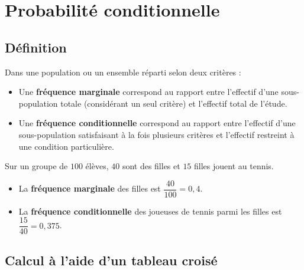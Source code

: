 \section{Probabilité conditionnelle}

\subsection{Définition}

\begin{defin}
	Dans une population ou un ensemble réparti selon deux critères :

	\begin{itemize}
		\item Une \textbf{fréquence marginale} correspond au rapport entre l'effectif d'une sous-population totale (considérant un seul critère) et l'effectif total de l'étude.
		\item Une \textbf{fréquence conditionnelle} correspond au rapport entre l'effectif d'une sous-population satisfaisant à la fois plusieurs critères et l'effectif restreint à une condition particulière.
	\end{itemize}
\end{defin}

\begin{ex}
	Sur un groupe de $100$ élèves, $40$ sont des filles et $15$ filles jouent au tennis.

	\begin{itemize}
		\item La \textbf{fréquence marginale} des filles est $\dfrac{40}{100} = 0{,}4$.
		\item La \textbf{fréquence conditionnelle} des joueuses de tennis parmi les filles est $\dfrac{15}{40} = 0{,}375$.
	\end{itemize}
\end{ex}

\newpage

\subsection{Calcul à l'aide d'un tableau croisé}


